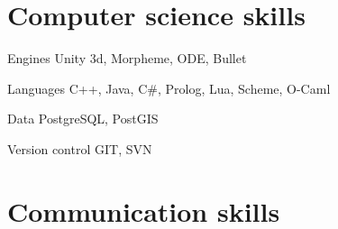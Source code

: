 \documentclass{tccv}
\begin{document}
\section{Computer science skills}

\begin{factlist}

\item{Engines}
     {Unity 3d, Morpheme, ODE, Bullet}
	 
\item{Languages}
     {C++, Java, C\#, Prolog, Lua, Scheme, O-Caml}
	 
\item{Data}
     {PostgreSQL, PostGIS}

\item{Version control}
     {GIT, SVN}

\end{factlist}











\section{Communication skills}
\end{document}
